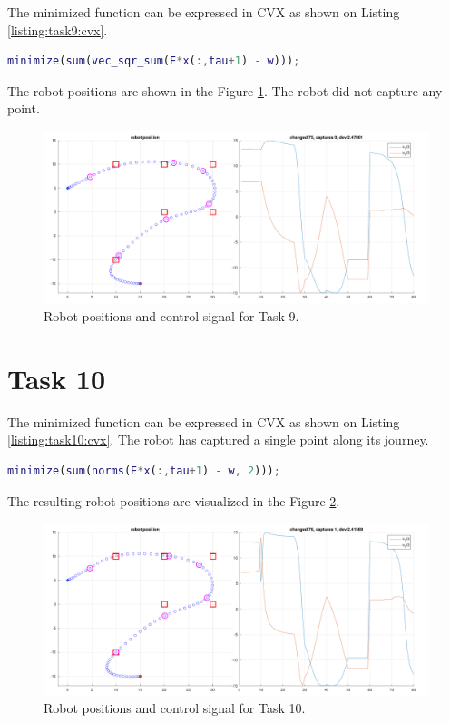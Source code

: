 The minimized function can be expressed in CVX as shown on Listing \ref{listing:task9:cvx}.

\begin{lstlisting}[language=Matlab, caption=CVX code for task 9., label=listing:task9:cvx]
minimize(sum(vec_sqr_sum(E*x(:,tau+1) - w)));
\end{lstlisting}

The robot positions are shown in the Figure \ref{fig:task9:graph}. The robot did not capture any point.

\begin{figure}[!htb]
    \caption{Robot positions and control signal for Task 9.}
    \label{fig:task9:graph}
    \centering    
    \includegraphics[width=1\linewidth]{part1/figures/task_9.pdf}
\end{figure}

\section {Task 10}

The minimized function can be expressed in CVX as shown on Listing \ref{listing:task10:cvx}. The robot has captured a single point along its journey.

\begin{lstlisting}[language=Matlab, caption=CVX code for task 10., label=listing:task10:cvx]
minimize(sum(norms(E*x(:,tau+1) - w, 2)));
\end{lstlisting}

The resulting robot positions are visualized in the Figure \ref{fig:task10:graph}.

\begin{figure}[!htb]
    \caption{Robot positions and control signal for Task 10.}
    \label{fig:task10:graph}
    \centering    
    \includegraphics[width=1\linewidth]{part1/figures/task_10.pdf}
\end{figure}

